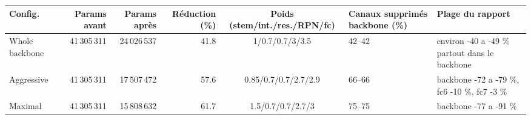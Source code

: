 \begin{tabular}{@{}lrrrcll@{}}
\toprule
Config. & Params avant & Params apr\`es & R\'eduction (\%) & Poids (stem/int./res./RPN/fc) & Canaux supprim\'es backbone (\%) & Plage du rapport \\
\midrule
Whole backbone & 41\,305\,311 & 24\,026\,537 & 41.8 & 1/0.7/0.7/3/3.5 & 42--42 & environ -40 a -49 \% partout dans le backbone \\
Aggressive & 41\,305\,311 & 17\,507\,472 & 57.6 & 0.85/0.7/0.7/2.7/2.9 & 66--66 & backbone -72 a -79 \%, fc6 -10 \%, fc7 -3 \% \\
Maximal & 41\,305\,311 & 15\,808\,632 & 61.7 & 1.5/0.7/0.7/2.7/3 & 75--75 & backbone -77 a -91 \% \\
\bottomrule
\end{tabular}